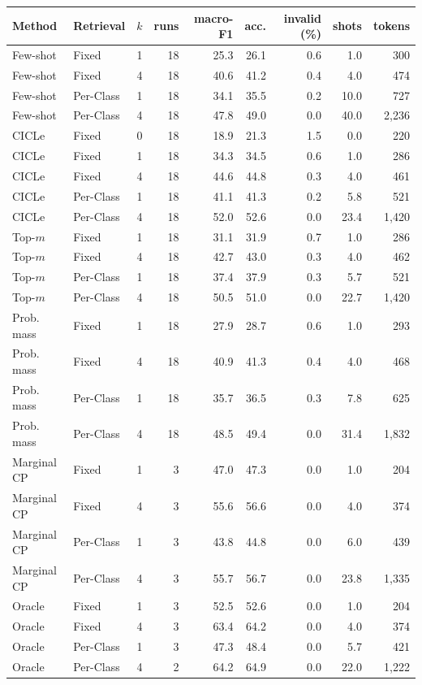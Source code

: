 \begin{tabular}{llrrrrrrr}
\toprule
Method & Retrieval & $k$ & runs & macro-F1 & acc. & invalid (\%) & shots & tokens \\
\midrule
Few-shot & Fixed & 1 & 18 & 25.3 & 26.1 & 0.6 & 1.0 & 300 \\
Few-shot & Fixed & 4 & 18 & 40.6 & 41.2 & 0.4 & 4.0 & 474 \\
Few-shot & Per-Class & 1 & 18 & 34.1 & 35.5 & 0.2 & 10.0 & 727 \\
Few-shot & Per-Class & 4 & 18 & 47.8 & 49.0 & 0.0 & 40.0 & 2,236 \\
CICLe & Fixed & 0 & 18 & 18.9 & 21.3 & 1.5 & 0.0 & 220 \\
CICLe & Fixed & 1 & 18 & 34.3 & 34.5 & 0.6 & 1.0 & 286 \\
CICLe & Fixed & 4 & 18 & 44.6 & 44.8 & 0.3 & 4.0 & 461 \\
CICLe & Per-Class & 1 & 18 & 41.1 & 41.3 & 0.2 & 5.8 & 521 \\
CICLe & Per-Class & 4 & 18 & 52.0 & 52.6 & 0.0 & 23.4 & 1,420 \\
\midrule
Top-$m$ & Fixed & 1 & 18 & 31.1 & 31.9 & 0.7 & 1.0 & 286 \\
Top-$m$ & Fixed & 4 & 18 & 42.7 & 43.0 & 0.3 & 4.0 & 462 \\
Top-$m$ & Per-Class & 1 & 18 & 37.4 & 37.9 & 0.3 & 5.7 & 521 \\
Top-$m$ & Per-Class & 4 & 18 & 50.5 & 51.0 & 0.0 & 22.7 & 1,420 \\
Prob. mass & Fixed & 1 & 18 & 27.9 & 28.7 & 0.6 & 1.0 & 293 \\
Prob. mass & Fixed & 4 & 18 & 40.9 & 41.3 & 0.4 & 4.0 & 468 \\
Prob. mass & Per-Class & 1 & 18 & 35.7 & 36.5 & 0.3 & 7.8 & 625 \\
Prob. mass & Per-Class & 4 & 18 & 48.5 & 49.4 & 0.0 & 31.4 & 1,832 \\
Marginal CP & Fixed & 1 & 3 & 47.0 & 47.3 & 0.0 & 1.0 & 204 \\
Marginal CP & Fixed & 4 & 3 & 55.6 & 56.6 & 0.0 & 4.0 & 374 \\
Marginal CP & Per-Class & 1 & 3 & 43.8 & 44.8 & 0.0 & 6.0 & 439 \\
Marginal CP & Per-Class & 4 & 3 & 55.7 & 56.7 & 0.0 & 23.8 & 1,335 \\
Oracle & Fixed & 1 & 3 & 52.5 & 52.6 & 0.0 & 1.0 & 204 \\
Oracle & Fixed & 4 & 3 & 63.4 & 64.2 & 0.0 & 4.0 & 374 \\
Oracle & Per-Class & 1 & 3 & 47.3 & 48.4 & 0.0 & 5.7 & 421 \\
Oracle & Per-Class & 4 & 2 & 64.2 & 64.9 & 0.0 & 22.0 & 1,222 \\
\bottomrule
\end{tabular}

